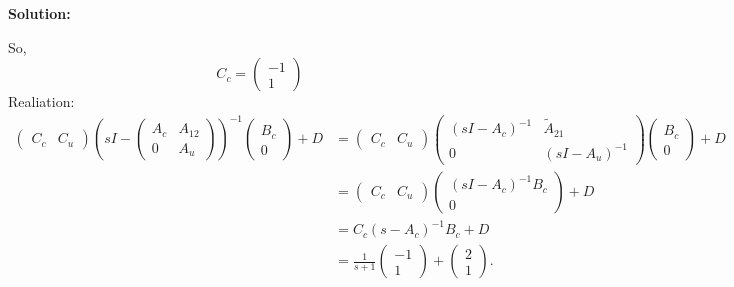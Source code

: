 \documentclass[12pt]{article}
\newenvironment{solution}{
    \textbf{Solution:}
    
}{
    
    \vspace{2em}
}
\begin{document}
\begin{solution}
\[    \]
    So,
    \[
        C_c = \begin{pmatrix}
            -1\\
            1
        \end{pmatrix}
    \]
    Realiation:
    \[
        \begin{aligned}
            \begin{pmatrix} C_c & C_u \end{pmatrix} 
                (sI - \begin{pmatrix} A_c & A_{12} \\ 0 & A_u \end{pmatrix})^{-1} 
                \begin{pmatrix} B_c \\ 0 \end{pmatrix} + D 
            &=\begin{pmatrix} 
                C_c & C_u 
            \end{pmatrix} 
            \begin{pmatrix} 
                (sI - A_c)^{-1} & \tilde{A}_{21} \\ 
                0 & (sI - A_u)^{-1} 
            \end{pmatrix} 
            \begin{pmatrix} B_c \\ 0 \end{pmatrix} + D \\
            &= \begin{pmatrix} 
                C_c & C_u 
            \end{pmatrix} 
            \begin{pmatrix} 
                (sI - A_c)^{-1}B_c \\ 
                0 
            \end{pmatrix} + D \\
            &= C_c (s - A_c)^{-1} B_c + D\\
            &= \frac{1}{s + 1} \begin{pmatrix} -1 \\ 1 \end{pmatrix} + \begin{pmatrix} 2 \\ 1 \end{pmatrix}.
        \end{aligned}
    \]



\end{solution}
\end{document}
